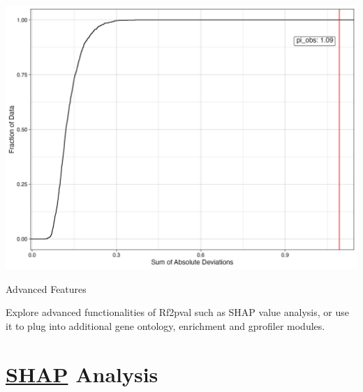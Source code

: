 \documentclass[
]{article}
\begin{document}
\begin{center}\includegraphics[width=1\linewidth]{images/demo_ecdf_plot} \end{center}

Advanced Features

Explore advanced functionalities of Rf2pval such as SHAP value analysis,
or use it to plug into additional gene ontology, enrichment and
gprofiler modules.

\hypertarget{shap-analysis}{%
\section{\texorpdfstring{\href{https://shap.readthedocs.io/en/latest/}{SHAP}
Analysis}{SHAP Analysis}}\label{shap-analysis}}
\end{document}
